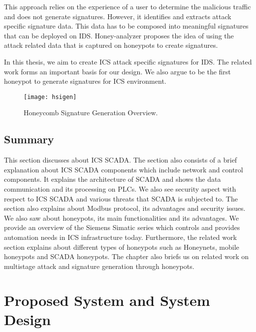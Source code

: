 \documentclass[article,msc=informatik,type=msc,colorback,accentcolor=tud9c]{tudthesis}
\begin{document}
		This approach relies on the experience of a user to determine the malicious traffic and does not generate signatures. However, it identifies and extracts attack specific signature data. This data has to be composed into meaningful signatures that can be deployed on \ac{IDS}. Honey-analyzer proposes the idea of using the attack related data that is captured on honeypots to create signatures.
		
		\vspace{3mm}
		In this thesis, we aim to create \ac{ICS} attack specific signatures for \ac{IDS}. The related work forms an important basis for our design. We also argue to be the first honeypot to generate signatures for \ac{ICS} environment.  
		
		\begin{figure}[H]
			     
			           \centering
			           \texttt{[image: hsigen]}
			           \caption[SCADA Hits]{\label{f:Honeycomb Signature Generation Overview}Honeycomb Signature Generation Overview.\cite{kreibich2004honeycomb}}
			           
			\end{figure}
		
	\subsection{Summary}
	This section discusses about ICS SCADA. The section also consists of a brief explanation about \ac{ICS} \ac{SCADA} components which include network and control components. It explains the architecture of \ac{SCADA} and shows the data communication and its processing on \ac{PLC}s. We also see security aspect with respect to \ac{ICS} \ac{SCADA} and various threats that \ac{SCADA} is subjected to. The section also explains about Modbus protocol, its advantages and security issues. We also saw about honeypots, its main functionalities and its advantages. We provide an overview of the Siemens Simatic series which controls and provides automation needs in \ac{ICS} infrastructure today. Furthermore, the related work section explains about different types of honeypots such as Honeynets, mobile honeypots and \ac{SCADA} honeypots. The chapter also briefs us on related work on multistage attack and signature generation through honeypots. 
    


  \newpage    
  
  \newpage       
  \section{Proposed System and System Design} \label{Proposed System and System Design} 
  
\end{document}
